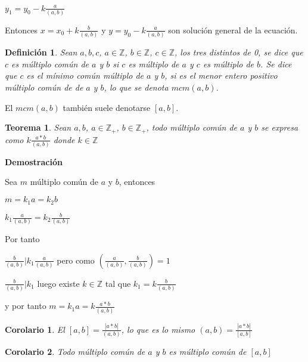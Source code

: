 \documentclass[a4paper,1pt]{report}
\newtheorem*{teo}{Teorema}
\newtheorem*{cor}{Corolario}
\newtheorem*{dfn}{Definición}
\begin{document}
$y_1=y_0-k\frac{a}{(a,b)}$

Entonces $x=x_0+k\frac{b}{(a,b)}$ y $y=y_0-k\frac{a}{(a,b)}$ son solución general de la ecuación.

\begin{dfn}
 Sean $a,b,c$, $a\in\mathbb{Z}$, $b\in\mathbb{Z}$, $c\in\mathbb{Z}$, los tres distintos de 0, se dice que $c$ es múltiplo común de $a$ y $b$ si $c$ es múltiplo de $a$ y $c$ es múltiplo de $b$. Se dice que $c$ es el mínimo común múltiplo de $a$ y $b$, si es el menor entero positivo múltiplo común de de $a$ y $b$, lo que se denota $mcm(a,b)$.
\end{dfn}

El $mcm(a,b)$ también suele denotarse $[a,b]$.



\begin{teo}
 Sean $a,b$, $a\in\mathbb{Z}_+$, $b\in\mathbb{Z}_+$, todo múltiplo común de $a$ y $b$ se expresa como $k\frac{a*b}{(a,b)}$ donde $k\in\mathbb{Z}$
\end{teo}

\textbf{Demostración}


Sea $m$ múltiplo común de $a$ y $b$, entonces

$m=k_1a=k_2b$

$k_1\frac{a}{(a,b)}=k_2\frac{b}{(a,b)}$

Por tanto

$\frac{b}{(a,b)}|k_1\frac{a}{(a,b)}$ pero como $(\frac{a}{(a,b)},\frac{b}{(a,b)})=1$

$\frac{b}{(a,b)}|k_1$ luego existe $k\in\mathbb{Z}$ tal que $k_1=k\frac{b}{(a,b)}$

y por tanto $m=k_1a=k\frac{a*b}{(a,b)}$

\begin{cor}
 El $[a,b]=\frac{|a*b|}{(a,b)}$, lo que es lo mismo $(a,b)=\frac{|a*b|}{[a,b]}$
\end{cor}

\begin{cor}
 Todo múltiplo común de $a$ y $b$ es múltiplo común de $[a,b]$
\end{cor}
\end{document}
